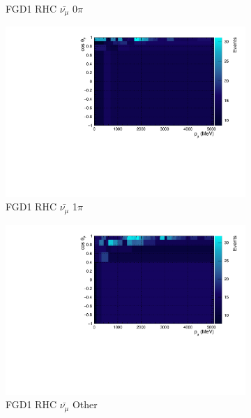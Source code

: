 \begin{figure}[!htbp]
\begin{subfigure}{.32\textwidth}
  \caption{FGD1 RHC $\bar{\nu_{\mu}}$ 0$\pi$}
  \label{fig:th2polynomFGD1_anti-numuCC_0pi}
\end{subfigure}
\begin{subfigure}{.32\textwidth}
  \centering
  \includegraphics[width=0.95\linewidth]{figs/TH2PolyNom_MC_FGD1_anti-numuCC_1pi}
  \caption{FGD1 RHC $\bar{\nu_{\mu}}$ 1$\pi$}
  \label{fig:th2polyth2polynomFGD1_anti-numuCC_1pi}
\end{subfigure}
\begin{subfigure}{.32\textwidth}
  \centering
  \includegraphics[width=0.95\linewidth]{figs/TH2PolyNom_MC_FGD1_anti-numuCC_other}
  \caption{FGD1 RHC $\bar{\nu_{\mu}}$ Other}
  \label{fig:th2polynomFGD1_anti-numuCC_other}
\end{subfigure}
\centering
\begin{subfigure}{.32\textwidth}
  \centering

\end{subfigure}
\end{figure}
